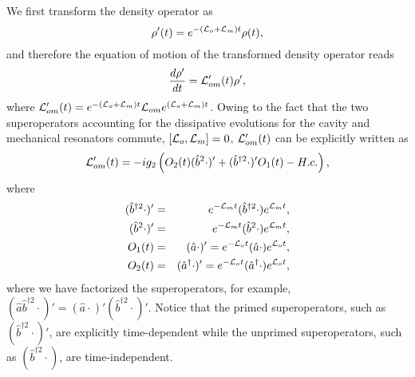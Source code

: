 \documentclass[pra,aps,showpacs,twocolumn,floatfix, superscriptaddress, nofootinbib, nobibnotes]{revtex4-1}
\begin{document}
We first transform the density operator as
\begin{equation}
 \rho'(t) = e^{-({\cal L}_o+{\cal L}_m)t}\rho(t),
 \label{eq:density_transformation}
\end{equation}
and therefore the equation of motion of the transformed density operator reads
\begin{equation}
\frac{d\rho'}{dt} = {{\cal L}_{om}'}(t)\rho',
 \label{eq_master_starting}
\end{equation}
where ${{\cal L}_{om}'}(t) = e^{-({\cal L}_o+{\cal L}_m)t}{\cal L}_{om}e^{({\cal L}_o+{\cal L}_m)t}$. Owing to the fact that the two superoperators accounting for the dissipative evolutions for the cavity and mechanical resonators commute, $[{\cal L}_o, {\cal L}_m]=0$, ${\cal L}_{om}'(t)$ can be explicitly written as 
\begin{equation}
 {{\cal L}_{om}'}(t) = -ig_2\left(O_2(t)(\hat b^{2}\cdot)'+(\hat b^{\dag 2}\cdot)'O_1(t)-H.c.\right), 
 \label{eq:optomech_superoperator}
\end{equation}
where 
\begin{eqnarray}
 (\hat b^{\dag 2}\cdot)'  &=& e^{-{\cal L}_m t}(\hat b^{\dag 2}\cdot)e^{{\cal L}_m t}, 
 \label{eq:superoperator_1} \\
 (\hat b^{2}\cdot)' &=& e^{-{\cal L}_m t}(\hat b^{2}\cdot)e^{{\cal L}_m t}, \\
O_1(t) &=& (\hat a\cdot)' = e^{-{\cal L}_o t}(\hat a\cdot)e^{{\cal L}_o t}, \\
 O_2(t) &=&(\hat a^\dag\cdot)' = e^{-{\cal L}_o t}(\hat a^\dag\cdot)e^{{\cal L}_o t},
\end{eqnarray}
where we have factorized the superoperators, for example, $(\hat a\hat b^{\dag 2}\cdot)'=(\hat a\cdot)'(\hat b^{\dag 2}\cdot)'$. Notice that the primed superoperators, such as $ (\hat b^{\dag 2}\cdot)'$, are explicitly time-dependent while the unprimed superoperators, such as $(\hat b^{\dag 2}\cdot)$, are time-independent. 
\end{document}
